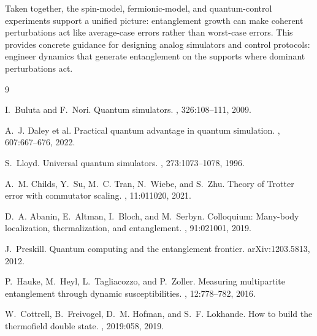 \documentclass[a4paper]{article}
\begin{document}
Taken together, the spin-model, fermionic-model, and quantum-control
experiments support a unified picture: entanglement growth can make coherent
perturbations act like average-case errors rather than worst-case errors. This
provides concrete guidance for designing analog simulators and control
protocols: engineer dynamics that generate entanglement on the supports where
dominant perturbations act.

\begin{thebibliography}{9}

I.~Buluta and F.~Nori.
\newblock Quantum simulators.
, 326:108--111, 2009.

A.~J. Daley et al.
\newblock Practical quantum advantage in quantum simulation.
, 607:667--676, 2022.

S.~Lloyd.
\newblock Universal quantum simulators.
, 273:1073--1078, 1996.

A.~M. Childs, Y.~Su, M.~C. Tran, N.~Wiebe, and S.~Zhu.
\newblock Theory of Trotter error with commutator scaling.
, 11:011020, 2021.

D.~A. Abanin, E.~Altman, I.~Bloch, and M.~Serbyn.
\newblock Colloquium: Many-body localization, thermalization, and entanglement.
, 91:021001, 2019.

J.~Preskill.
\newblock Quantum computing and the entanglement frontier.
\newblock arXiv:1203.5813, 2012.

P.~Hauke, M.~Heyl, L.~Tagliacozzo, and P.~Zoller.
\newblock Measuring multipartite entanglement through dynamic susceptibilities.
, 12:778--782, 2016.

W.~Cottrell, B.~Freivogel, D.~M. Hofman, and S.~F. Lokhande.
\newblock How to build the thermofield double state.
, 2019:058, 2019.

\end{thebibliography}
\end{document}
